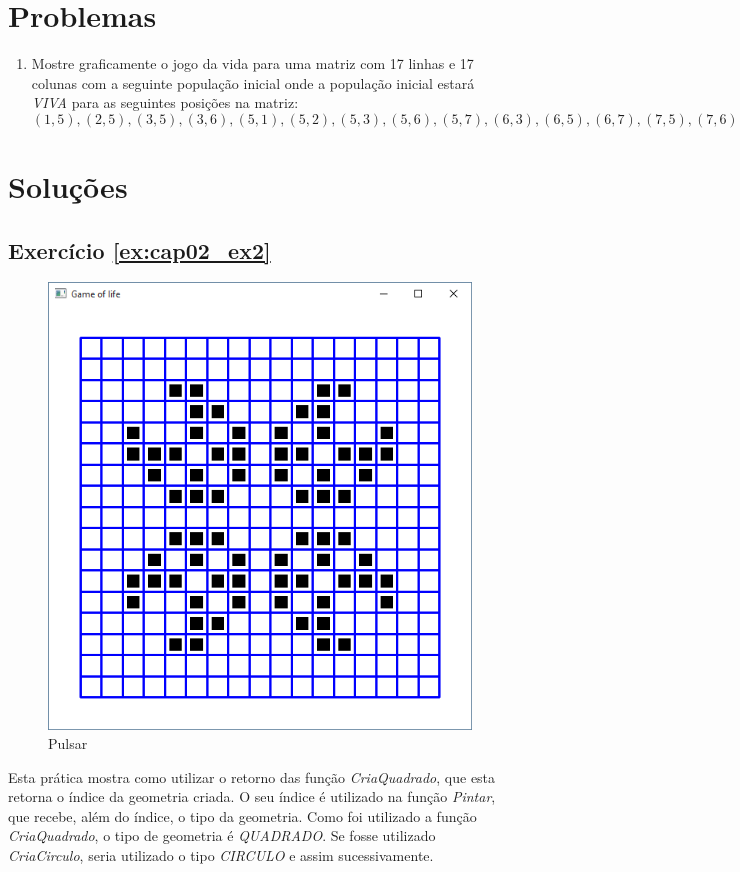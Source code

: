 
\section*{Problemas}
\begin{enumerate}
\item
  Mostre graficamente o jogo da vida para uma matriz com 17 linhas e 17 colunas com a seguinte população inicial onde a população inicial estará \emph{VIVA} para as seguintes posições na matriz:
  $$
    (1,5), (2,5), (3,5), (3,6), (5,1), (5,2), (5,3), (5,6), (5,7), (6,3), (6,5), (6,7), (7,5), (7,6)
  $$
  \label{ex:cap02_ex2}
\end{enumerate}

\section*{Soluções}

\subsection*{Exercício \ref{ex:cap02_ex2}}
\begin{figure}[ht]
  \centerline{\includegraphics[width=.5\textwidth]{img/cap2_ex9.png}}
  \caption{Pulsar}
  \label{fig:cap02_ex2}
\end{figure}
Esta prática mostra como utilizar o retorno das função \emph{CriaQuadrado}, que esta retorna o índice da geometria criada. O seu índice é utilizado na função \emph{Pintar}, que recebe, além do índice, o tipo da geometria. Como foi utilizado a função \emph{CriaQuadrado}, o tipo de geometria é \emph{QUADRADO}. Se fosse utilizado \emph{CriaCirculo}, seria utilizado o tipo \emph{CIRCULO} e assim sucessivamente.


